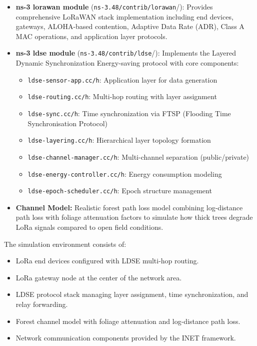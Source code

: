 \begin{itemize}
    \item \textbf{ns-3 lorawan module} (\texttt{ns-3.48/contrib/lorawan}/): Provides
          comprehensive LoRaWAN stack implementation including end devices, gateways,
          ALOHA-based contention, Adaptive Data Rate (ADR), Class A MAC operations,
          and application layer protocols.
    \item \textbf{ns-3 ldse module} (\texttt{ns-3.48/contrib/ldse}/): Implements the
          Layered Dynamic Synchronization Energy-saving protocol with core components:
          \begin{itemize}
              \item \texttt{ldse-sensor-app.cc/h}: Application layer for data generation
              \item \texttt{ldse-routing.cc/h}: Multi-hop routing with layer assignment
              \item \texttt{ldse-sync.cc/h}: Time synchronization via FTSP (Flooding Time
                Synchronisation Protocol)
              \item \texttt{ldse-layering.cc/h}: Hierarchical layer topology formation
              \item \texttt{ldse-channel-manager.cc/h}: Multi-channel separation (public/private)
              \item \texttt{ldse-energy-controller.cc/h}: Energy consumption modeling
              \item \texttt{ldse-epoch-scheduler.cc/h}: Epoch structure management
          \end{itemize}
    \item \textbf{Channel Model:} Realistic forest path loss model combining
          log-distance path loss with foliage attenuation factors to simulate how
          thick trees degrade LoRa signals compared to open field conditions.
\end{itemize}

The simulation environment consists of:

\begin{itemize}
    \item LoRa end devices configured with LDSE multi-hop routing.
    \item LoRa gateway node at the center of the network area.
    \item LDSE protocol stack managing layer assignment, time synchronization, and
          relay forwarding.
    \item Forest channel model with foliage attenuation and log-distance path loss.
    \item Network communication components provided by the INET framework.
\end{itemize}


